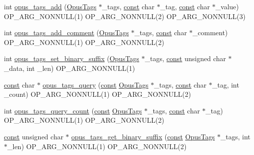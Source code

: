 \begin{DoxyCompactItemize}
\item 
int \hyperlink{group__header__info_ga42bc0321740b618271c4cd0ae076d29a}{opus\+\_\+tags\+\_\+add} (\hyperlink{struct_opus_tags}{Opus\+Tags} $\ast$\+\_\+tags, \hyperlink{zconf_8h_a2c212835823e3c54a8ab6d95c652660e}{const} char $\ast$\+\_\+tag, \hyperlink{zconf_8h_a2c212835823e3c54a8ab6d95c652660e}{const} char $\ast$\+\_\+value) O\+P\+\_\+\+A\+R\+G\+\_\+\+N\+O\+N\+N\+U\+LL(1) O\+P\+\_\+\+A\+R\+G\+\_\+\+N\+O\+N\+N\+U\+LL(2) O\+P\+\_\+\+A\+R\+G\+\_\+\+N\+O\+N\+N\+U\+LL(3)
\item 
int \hyperlink{group__header__info_ga76ac5425d8c2ca9a994f84adfcc6cb98}{opus\+\_\+tags\+\_\+add\+\_\+comment} (\hyperlink{struct_opus_tags}{Opus\+Tags} $\ast$\+\_\+tags, \hyperlink{zconf_8h_a2c212835823e3c54a8ab6d95c652660e}{const} char $\ast$\+\_\+comment) O\+P\+\_\+\+A\+R\+G\+\_\+\+N\+O\+N\+N\+U\+LL(1) O\+P\+\_\+\+A\+R\+G\+\_\+\+N\+O\+N\+N\+U\+LL(2)
\item 
int \hyperlink{group__header__info_ga670be1155863aabc9f8d2cf064021131}{opus\+\_\+tags\+\_\+set\+\_\+binary\+\_\+suffix} (\hyperlink{struct_opus_tags}{Opus\+Tags} $\ast$\+\_\+tags, \hyperlink{zconf_8h_a2c212835823e3c54a8ab6d95c652660e}{const} unsigned char $\ast$\+\_\+data, int \+\_\+len) O\+P\+\_\+\+A\+R\+G\+\_\+\+N\+O\+N\+N\+U\+LL(1)
\item 
\hyperlink{zconf_8h_a2c212835823e3c54a8ab6d95c652660e}{const} char $\ast$ \hyperlink{group__header__info_gad43a7ed5844debd7d4025335f096bc27}{opus\+\_\+tags\+\_\+query} (\hyperlink{zconf_8h_a2c212835823e3c54a8ab6d95c652660e}{const} \hyperlink{struct_opus_tags}{Opus\+Tags} $\ast$\+\_\+tags, \hyperlink{zconf_8h_a2c212835823e3c54a8ab6d95c652660e}{const} char $\ast$\+\_\+tag, int \+\_\+count) O\+P\+\_\+\+A\+R\+G\+\_\+\+N\+O\+N\+N\+U\+LL(1) O\+P\+\_\+\+A\+R\+G\+\_\+\+N\+O\+N\+N\+U\+LL(2)
\item 
int \hyperlink{group__header__info_ga6e0bbe5a717115180bf4aa596bd0b2d1}{opus\+\_\+tags\+\_\+query\+\_\+count} (\hyperlink{zconf_8h_a2c212835823e3c54a8ab6d95c652660e}{const} \hyperlink{struct_opus_tags}{Opus\+Tags} $\ast$\+\_\+tags, \hyperlink{zconf_8h_a2c212835823e3c54a8ab6d95c652660e}{const} char $\ast$\+\_\+tag) O\+P\+\_\+\+A\+R\+G\+\_\+\+N\+O\+N\+N\+U\+LL(1) O\+P\+\_\+\+A\+R\+G\+\_\+\+N\+O\+N\+N\+U\+LL(2)
\item 
\hyperlink{zconf_8h_a2c212835823e3c54a8ab6d95c652660e}{const} unsigned char $\ast$ \hyperlink{group__header__info_gac13718002d2ca508ed1c04a40339877d}{opus\+\_\+tags\+\_\+get\+\_\+binary\+\_\+suffix} (\hyperlink{zconf_8h_a2c212835823e3c54a8ab6d95c652660e}{const} \hyperlink{struct_opus_tags}{Opus\+Tags} $\ast$\+\_\+tags, int $\ast$\+\_\+len) O\+P\+\_\+\+A\+R\+G\+\_\+\+N\+O\+N\+N\+U\+LL(1) O\+P\+\_\+\+A\+R\+G\+\_\+\+N\+O\+N\+N\+U\+LL(2)

\end{DoxyCompactItemize}
